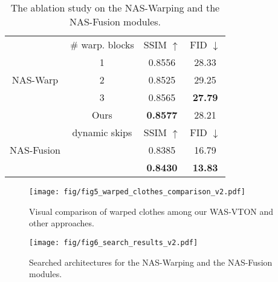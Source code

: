 \documentclass[sigconf]{acmart}
\newcommand{\cmark}{\ding{51}}%
\newcommand{\xmark}{\ding{55}}%
\begin{document}
\begin{table}[]
\centering
\begin{tabular}{c|c|cc}
\toprule
\multirow{5}{*}{NAS-Warp} & \# warp. blocks & SSIM $\uparrow$  & FID $\downarrow$ \\ \cmidrule{2-4}
                     & 1              & 0.8556       & 28.33   \\
                     & 2              & 0.8525       & 29.25 \\
                     & 3              & 0.8565       & \textbf{27.79}   \\
                     & Ours              & \textbf{0.8577}    & 28.21   \\
\midrule
\multirow{3}{*}{NAS-Fusion} & dynamic skips & SSIM $\uparrow$  & FID $\downarrow$ \\ \cmidrule{2-4}
                     & \xmark         & 0.8385  & 16.79  \\    
                     & \cmark         & \textbf{0.8430}  & \textbf{13.83}  \\
\bottomrule
\end{tabular}
\caption{The ablation study on the NAS-Warping and the NAS-Fusion modules.}
 \vspace{-7mm}
\label{tab:ablation}
\end{table}

\begin{figure}
  \centering
  \texttt{[image: fig/fig5\_warped\_clothes\_comparison\_v2.pdf]}
  \vspace{-8mm}
  \caption{Visual comparison of warped clothes among our WAS-VTON and other approaches.}
  \vspace{-4mm}
  \label{fig:fig6}
\end{figure}


\begin{figure*}[t]
  \centering
  \texttt{[image: fig/fig6\_search\_results\_v2.pdf]}
  \vspace{-7mm}
  \caption{Searched architectures for the NAS-Warping and the NAS-Fusion modules. 
  \vspace{-2mm}
  }
  \label{fig:fig5}
\end{figure*}
\end{document}
